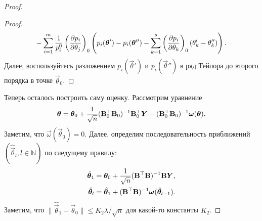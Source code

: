 \begin{proof}
\begin{proof}
\begin{align*}
			&\hphantom{=}- \sum_{i = 1}^{m} \frac{1}{p_{i}^{0}}\left(\pdv{p_{i}}{\theta_{j}}\right)_{0}\left(p_{i}(\bm{\theta}') - p_{i}(\bm{\theta}'') - \sum_{k = 1}^{s}\left(\pdv{p_{i}}{\theta_{k}}\right)_{0}(\theta'_{k} - \theta''_{k})\right).
		\end{align*}
		Далее, воспользуйтесь разложением $p_{i}(\vec{\theta}')$ и $p_{i}(\vec{\theta}'')$ в ряд Тейлора до второго порядка в точке $\vec{\theta}_{0}$.
	\end{proof}
	Теперь осталось построить саму оценку. Рассмотрим уравнение 
	\[
		\bm{\theta}
		= \bm{\theta}_{0} + \frac{1}{\sqrt{n}}(\mathbf{B}_{0}^{\top}\mathbf{B}_{0})^{-1}\mathbf{B}_{0}^{\top}\bm{Y} + (\mathbf{B}_{0}^{\top}\mathbf{B}_{0})^{-1}\bm{\omega}(\bm{\theta}).
	\]
	Заметим, что $\vec{\omega}(\vec{\theta}_{0}) = 0$. Далее, определим последовательность приближений $(\hat{\vec{\theta}}_{l}, l \in \mathbb{N})$ по следущему правилу:
	\begin{align*}
		\hat{\bm{\theta}}_{1}
		&= \bm{\theta}_{0} + \frac{1}{\sqrt{n}}(\mathbf{B}^{\top}\mathbf{B})^{-1}\mathbf{B}\bm{Y}, \\
		\hat{\bm{\theta}}_{l}
		&= \hat{\bm{\theta}}_{1} + (\mathbf{B}^{\top}\mathbf{B})^{-1}\bm{\omega}(\hat{\bm{\theta}}_{l - 1}).
	\end{align*}
	Заметим, что $\|\hat{\vec{\theta}}_{1} - \vec{\theta}_{0}\| \leq K_{2}\lambda/\sqrt{n}$ для какой-то константы $K_{2}$.
\end{proof}